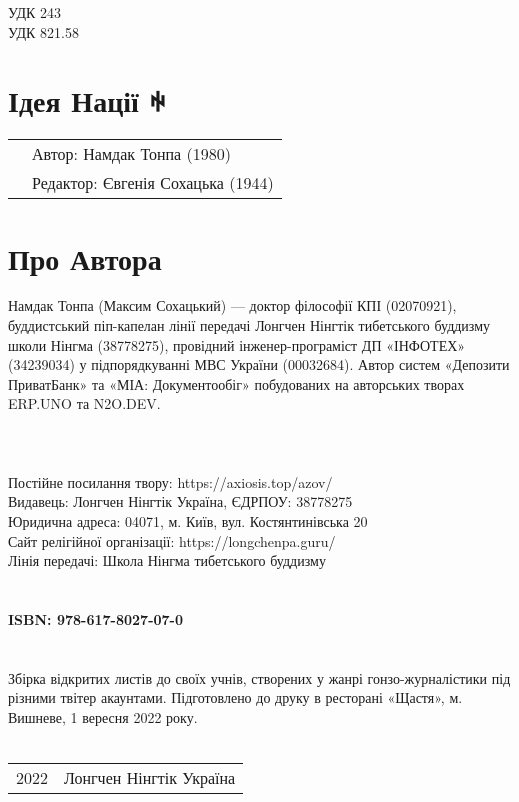 УДК 243\\
УДК 821.58

\section*{Ідея Нації ꑭ}

\begin{tabular}{ll}
& Автор: Намдак Тонпа (1980)\\
& Редактор: Євгенія Сохацька (1944)\\
\end{tabular}

\section*{Про Автора}

Намдак Тонпа (Максим Сохацький) --- доктор філософії КПІ (02070921),
буддистський піп-капелан лінії передачі
Лонгчен Нінгтік тибетського буддизму школи Нінгма (38778275),
провідний інженер-програміст ДП «ІНФОТЕХ» (34239034)
у підпорядкуванні МВС України (00032684).
Автор систем «Депозити ПриватБанк» та «МІА: Документообіг»
побудованих на авторських творах ERP.UNO та N2O.DEV.
\\
\\
\\
\\
Постійне посилання твору: https://axiosis.top/azov/ \\
Видавець: Лонгчен Нінгтік Україна, ЄДРПОУ: 38778275 \\
Юридична адреса: 04071, м. Київ, вул. Костянтинівська 20 \\
Сайт релігійної організації: https://longchenpa.guru/ \\
Лінія передачі: Школа Нінгма тибетського буддизму \\
\\
\\
{\bf ISBN: 978-617-8027-07-0 \hspace{2em}} \\
\\
\\
\indent Збірка відкритих листів до своїх учнів, створених у жанрі гонзо-журналістики під різними твітер акаунтами.
Підготовлено до друку в ресторані «Щастя»,
м. Вишневе, 1 вересня 2022 року.
\\
\\
\begin{tabular}{ll}
\textcopyright{} 2022 & Лонгчен Нінгтік Україна
\end{tabular}

